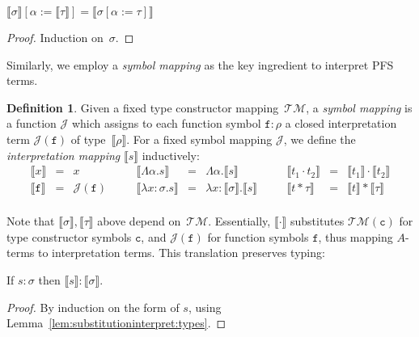 \documentclass[a4paper,UKenglish,cleveref,autoref,numberwithinsect]{lipics-v2019}
\theoremstyle{definition}
\newtheorem{defn}[theorem]{Definition}
\newcommand{\app}[2]{#1 \cdot #2}
\newcommand{\tapp}[2]{#1 * #2}
\newcommand{\abs}[2]{\lambda #1.#2}
\newcommand{\tabs}[2]{\Lambda #1.#2}
\newcommand{\typeinterpret}[1]{\llbracket #1 \rrbracket}
\newcommand{\interpret}[1]{\llbracket #1 \rrbracket}
\newcommand{\Typemap}{\mathcal{T\!M}}
\newcommand{\Termmap}{\mathcal{J}}
\begin{document}
\begin{lemma}\label{lem:substitutioninterpret:types}
  $\typeinterpret{\sigma}[\alpha:=\typeinterpret{\tau}] =
  \typeinterpret{\sigma[\alpha:=\tau]}$
\end{lemma}

\begin{proof}
  Induction on~$\sigma$.
\end{proof}

Similarly, we employ a \emph{symbol mapping} as the key
ingredient to interpret PFS terms.

\begin{defn}
  Given a fixed type constructor mapping~$\Typemap$, a \emph{symbol
    mapping} is a function $\Termmap$ which assigns to each function
  symbol $\mathtt{f} : \rho$ a closed interpretation term
  $\Termmap(\mathtt{f})$ of type~$\typeinterpret{\rho}$. For a fixed
  symbol mapping $\Termmap$, we define the \emph{interpretation
    mapping} $\interpret{s}$ inductively:
  \[
    \begin{array}{rclcrclcrcl}
      \interpret{x} & = & x &\quad&
      \interpret{\tabs{\alpha}{s}} & = & \tabs{\alpha}{\interpret{s}} &\quad&
      \interpret{\app{t_1}{t_2}} &=& \app{\interpret{t_1}}{\interpret{t_2}} \\
      \interpret{\mathtt{f}} &=& \Termmap(\mathtt{f}) & \quad &
      \interpret{\abs{x:\sigma}{s}} & = & \abs{x:\typeinterpret{\sigma}}{
                                          \interpret{s}} & \quad &
      \interpret{\tapp{t}{\tau}} &=& \tapp{\interpret{t}}{\typeinterpret{\tau}} \\
    \end{array}
  \]
\end{defn}

Note that $\typeinterpret{\sigma},\typeinterpret{\tau}$ above depend
on~$\Typemap$. Essentially, $\interpret{\cdot}$ substitutes
$\Typemap(\mathtt{c})$ for type constructor symbols $\mathtt{c}$, and
$\Termmap(\mathtt{f})$ for function symbols $\mathtt{f}$, thus mapping
$A$-terms to interpretation terms.  This translation preserves typing:

\begin{lemma}
  If $s : \sigma$ then $\interpret{s} : \typeinterpret{\sigma}$.
\end{lemma}

\begin{proof}
  By induction on the form of $s$, using
  Lemma~\ref{lem:substitutioninterpret:types}.
\end{proof}
\end{document}

